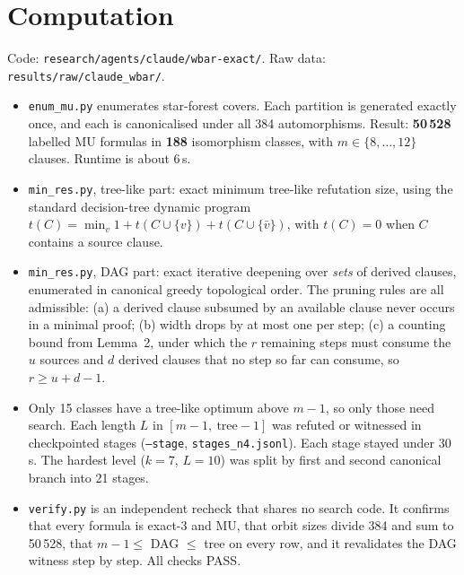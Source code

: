 \documentclass[11pt]{article}
\begin{document}
\section{Computation}
Code: \texttt{research/agents/claude/wbar-exact/}. Raw data: \texttt{results/raw/claude\_wbar/}.
\begin{itemize}
\item \texttt{enum\_mu.py} enumerates star-forest covers. Each partition is generated exactly once, and each is canonicalised under all 384 automorphisms. Result: \textbf{50\,528} labelled MU formulas in \textbf{188} isomorphism classes, with $m\in\{8,\dots,12\}$ clauses. Runtime is about 6\,s.
\item \texttt{min\_res.py}, tree-like part: exact minimum tree-like refutation size, using the standard decision-tree dynamic program $t(C)=\min_v 1+t(C\cup\{v\})+t(C\cup\{\bar v\})$, with $t(C)=0$ when $C$ contains a source clause.
\item \texttt{min\_res.py}, DAG part: exact iterative deepening over \emph{sets} of derived clauses, enumerated in canonical greedy topological order. The pruning rules are all admissible: (a) a derived clause subsumed by an available clause never occurs in a minimal proof; (b) width drops by at most one per step; (c) a counting bound from Lemma~2, under which the $r$ remaining steps must consume the $u$ sources and $d$ derived clauses that no step so far can consume, so $r\ge u+d-1$.
\item Only 15 classes have a tree-like optimum above $m-1$, so only those need search. Each length $L$ in $[m-1,\ \text{tree}-1]$ was refuted or witnessed in checkpointed stages (\texttt{--stage}, \texttt{stages\_n4.jsonl}). Each stage stayed under 30\,s. The hardest level ($k{=}7$, $L{=}10$) was split by first and second canonical branch into 21 stages.
\item \texttt{verify.py} is an independent recheck that shares no search code. It confirms that every formula is exact-3 and MU, that orbit sizes divide 384 and sum to 50\,528, that $m-1\le$ DAG $\le$ tree on every row, and it revalidates the DAG witness step by step. All checks PASS.
\end{itemize}
\end{document}
